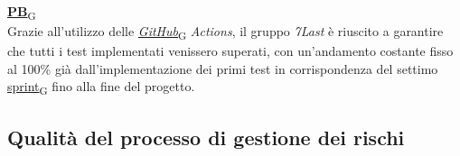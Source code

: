 \begin{flushleft}
\href{https://7last.github.io/docs/pb/documentazione-interna/glossario\#product-baseline}{\textbf{PB}\textsubscript{G}} \\
Grazie all'utilizzo delle \href{https://7last.github.io/docs/pb/documentazione-interna/glossario\#github}{\textit{GitHub}\textsubscript{G}}\textit{ Actions}, il gruppo \textit{7Last} è riuscito a garantire che tutti i test implementati venissero superati, con un'andamento costante fisso al 100\% già dall'implementazione dei primi test in corrispondenza del settimo \href{https://7last.github.io/docs/pb/documentazione-interna/glossario\#sprint}{sprint\textsubscript{G}} fino alla fine del progetto.
\end{flushleft}

\newpage
\subsection{Qualità del processo di gestione dei rischi}

